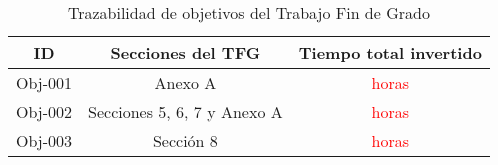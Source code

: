\begin{table}[H]
    \centering
    \begin{tabular}{|c|c|c|}
    \hline
    \textbf{ID} & \textbf{Secciones del TFG} & \textbf{Tiempo total invertido} \\
    \hline
    Obj-001 & Anexo A & \textcolor{red}{horas} \\
    \hline
    Obj-002 & Secciones 5, 6, 7 y Anexo A & \textcolor{red}{horas} \\
    \hline
    Obj-003 & Sección 8 & \textcolor{red}{horas} \\
    \hline
    \end{tabular}
\caption{Trazabilidad de objetivos del Trabajo Fin de Grado}
\label{tab:trazabilidadTFG}
\end{table}
